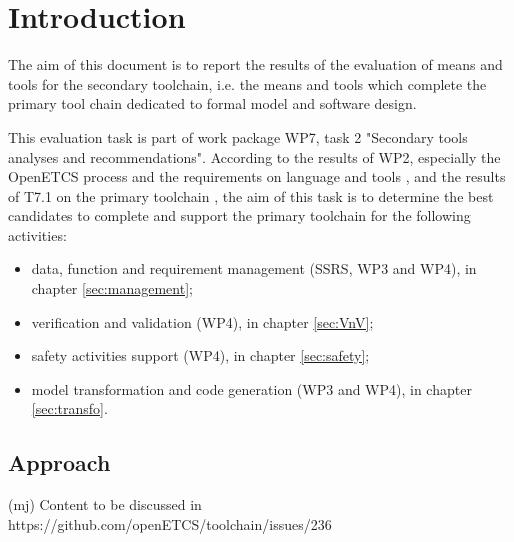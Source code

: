 

\chapter{Introduction}
\label{sec:intro}

The aim of this document is to report the results of the evaluation of means and tools for the secondary toolchain, i.e. the means and tools which complete the primary tool chain dedicated to formal model and software design.

This evaluation task is part of work package WP7, task 2 "Secondary  tools analyses and recommendations". According to the results of WP2, especially the OpenETCS process and the
requirements on language and tools \citep{D2_6}, and the results of T7.1 on the primary toolchain \citep{D7.1},  the aim of this task is to determine the best candidates to complete and support the primary toolchain for the following activities:

\begin{itemize}
\item data, function and requirement management (SSRS, WP3 and WP4), in chapter \ref{sec:management};
\item verification and  validation (WP4), in chapter \ref{sec:VnV};
\item safety activities support (WP4), in chapter \ref{sec:safety};
\item model transformation and code generation (WP3 and WP4), in chapter \ref{sec:transfo}.
\end{itemize}

\section{Approach}

(mj) Content to be discussed in https://github.com/openETCS/toolchain/issues/236





